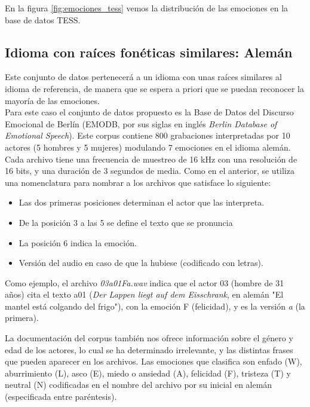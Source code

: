 \documentclass[11pt,a4paper,spanish]{book}
\begin{document}
	En la figura \ref{fig:emociones_tess} vemos la distribución de las emociones en la base de datos TESS.


	
	\subsection{Idioma con raíces fonéticas similares: Alemán} Este conjunto de datos pertenecerá a un idioma con unas raíces similares al idioma de referencia, de manera que se espera a priori que se puedan reconocer la mayoría de las emociones.\\
	
	Para este caso el conjunto de datos propuesto es la Base de Datos del Discurso Emocional de Berlín (EMODB, por sus siglas en inglés \emph{Berlin Database of Emotional Speech}). Este corpus contiene 800 grabaciones interpretadas por 10 actores (5 hombres y 5 mujeres) modulando 7 emociones en el idioma alemán. Cada archivo tiene una frecuencia de muestreo de 16 kHz con una resolución de 16 bits, y una duración de 3 segundos de media. Como en el anterior, se utiliza una nomenclatura para nombrar a los archivos que satisface lo siguiente:
	\begin{itemize}
		\item Las dos primeras posiciones determinan el actor que las interpreta.
		\item De la posición 3 a las 5 se define el texto que se pronuncia
		\item La posición 6 indica la emoción.
		\item Versión del audio en caso de que la hubiese (codificado con letras).
	\end{itemize}

	Como ejemplo, el archivo \emph{03a01Fa.wav} indica que el actor 03 (hombre de 31 años) cita el texto a01 (\emph{Der Lappen liegt auf dem Eisschrank}, en alemán "El mantel está colgando del frigo"), con la emoción F (felicidad), y es la versión \emph{a} (la primera).
	
	La documentación del corpus también nos ofrece información sobre el género y edad de los actores, lo cual se ha determinado irrelevante, y las distintas frases que pueden aparecer en los archivos.
	Las emociones que clasifica son enfado (W), aburrimiento (L), asco (E), miedo o ansiedad (A), felicidad (F), tristeza (T) y neutral (N) codificadas en el nombre del archivo por su inicial en alemán (especificada entre paréntesis).
\end{document}
